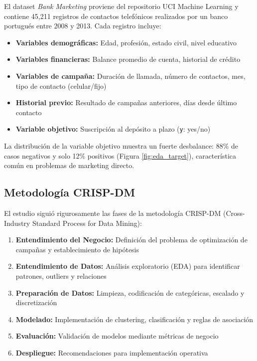 \documentclass[12pt,letterpaper]{article}
\begin{document}
El dataset \textit{Bank Marketing} \cite{moro2014} proviene del repositorio UCI Machine Learning y contiene 45,211 registros de contactos telefónicos realizados por un banco portugués entre 2008 y 2013. Cada registro incluye:

\begin{itemize}
    \item \textbf{Variables demográficas:} Edad, profesión, estado civil, nivel educativo
    \item \textbf{Variables financieras:} Balance promedio de cuenta, historial de crédito
    \item \textbf{Variables de campaña:} Duración de llamada, número de contactos, mes, tipo de contacto (celular/fijo)
    \item \textbf{Historial previo:} Resultado de campañas anteriores, días desde último contacto
    \item \textbf{Variable objetivo:} Suscripción al depósito a plazo (\texttt{y}: yes/no)
\end{itemize}

La distribución de la variable objetivo muestra un fuerte desbalance: 88\% de casos negativos y solo 12\% positivos (Figura \ref{fig:eda_target}), característica común en problemas de marketing directo.

\subsection{Metodología CRISP-DM}

El estudio siguió rigurosamente las fases de la metodología CRISP-DM (Cross-Industry Standard Process for Data Mining):

\begin{enumerate}
    \item \textbf{Entendimiento del Negocio:} Definición del problema de optimización de campañas y establecimiento de hipótesis
    \item \textbf{Entendimiento de Datos:} Análisis exploratorio (EDA) para identificar patrones, outliers y relaciones
    \item \textbf{Preparación de Datos:} Limpieza, codificación de categóricas, escalado y discretización
    \item \textbf{Modelado:} Implementación de clustering, clasificación y reglas de asociación
    \item \textbf{Evaluación:} Validación de modelos mediante métricas de negocio
    \item \textbf{Despliegue:} Recomendaciones para implementación operativa
\end{enumerate}
\end{document}
